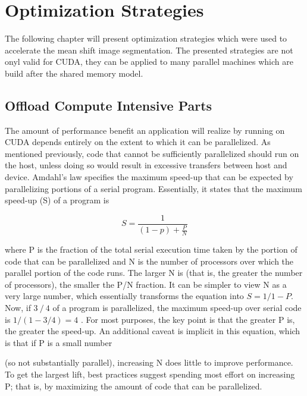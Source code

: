 \chapter{Optimization Strategies}
\label{ch:optimization}


The following chapter will present optimization strategies which were used to
accelerate the mean shift image segmentation. The presented strategies are not 
onyl valid for CUDA, they can be applied to many parallel machines which are 
build after the shared memory model. 

\section{Offload Compute Intensive Parts}
\label{sec:offload_intensive}
\color{seccolor}

The amount of performance benefit an application will realize by running on CUDA
depends entirely on the extent to which it can be parallelized. As mentioned
previously, code that cannot be sufficiently parallelized should run on the
host, unless doing so would result in excessive transfers between host and
device. Amdahl’s law specifies the maximum speed-up that can be expected by
parallelizing portions of a serial program. Essentially, it states that the
maximum speed-up (S) of a program is

\begin{equation}
	S = \frac{1}{(1-p) + \frac{P}{N} }
\end{equation}

where P is the fraction of the total serial execution time taken by the portion
of code that can be parallelized and N is the number of processors over which
the parallel portion of the code runs. The larger N is (that is, the greater the
number of processors), the smaller the P/N fraction. It can be simpler to view N
as a very large number, which essentially transforms the equation into $S=1/1-P$. 
Now, if $3⁄4$ of a program is parallelized, the maximum speed-up over serial
code is $1/(1- 3/4) = 4$ . For most purposes, the key point is that the
greater P is, the greater the speed-up. An additional caveat is implicit in this
equation, which is that if P is a small number


(so not substantially parallel), increasing N does little to improve
performance. To get the largest lift, best practices suggest spending most
effort on increasing P; that is, by maximizing the amount of code that can be
parallelized.
\color{black}

